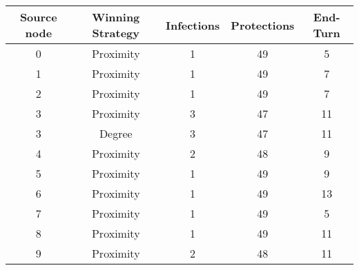 \documentclass[results.tex]{subfiles}
\begin{document}
    \begin{center}
        \begin{tabular}{| c || c | c | c | c |}
            \hline
            {\bfseries Source node} & {\bfseries Winning Strategy} & {\bfseries Infections} & {\bfseries Protections}
            & {\bfseries End-Turn}
            \\  %
            \hline\hline
            0                       & Proximity                    & 1                      & 49                      & 5                    \\
            \hline
            1                       & Proximity                    & 1                      & 49                      & 7                    \\
            \hline
            2                       & Proximity                    & 1                      & 49                      & 7                    \\
            \hline
            3                       & Proximity                    & 3                      & 47                      & 11                   \\
            \hline
            3                       & Degree                       & 3                      & 47                      & 11                   \\
            \hline
            4                       & Proximity                    & 2                      & 48                      & 9                    \\
            \hline
            5                       & Proximity                    & 1                      & 49                      & 9                    \\
            \hline
            6                       & Proximity                    & 1                      & 49                      & 13                   \\
            \hline
            7                       & Proximity                    & 1                      & 49                      & 5                    \\
            \hline
            8                       & Proximity                    & 1                      & 49                      & 11                   \\
            \hline
            9                       & Proximity                    & 2                      & 48                      & 11                   \\

\end{tabular}
\end{center}
\end{document}
